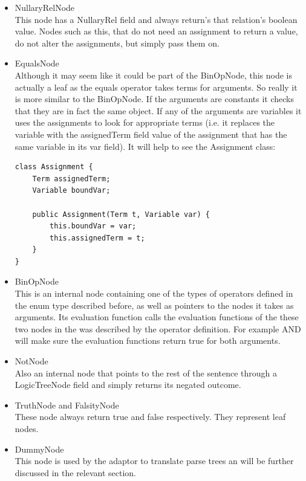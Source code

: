 \documentclass{report}
\begin{document}
\begin{itemize}
\item NullaryRelNode \\
This node has a NullaryRel field and always return's that relation's boolean 
value. Nodes such as this, that do not need an assignment to return a value,
do not alter the assignments, but simply pass them on.

\item EqualsNode \\
Although it may seem like it could be part of the BinOpNode, this node is 
actually a leaf as the equals operator takes terms for arguments. So really it 
is more similar to the BinOpNode. If the arguments are constants it checks that 
they are in fact the same object. If any of the arguments are variables it uses 
the assignments to look for appropriate terms (i.e. it replaces the variable 
with the assignedTerm field value of the assignment that has the same variable 
in its var field). It will help to see the Assignment class:
\begin{verbatim}
class Assignment {
    Term assignedTerm;
    Variable boundVar;

    public Assignment(Term t, Variable var) {
        this.boundVar = var;
        this.assignedTerm = t;
    }
}
\end{verbatim}

\item BinOpNode \\
This is an internal node containing one of the types of operators defined in the 
enum type described before, as well as pointers to the nodes it takes as 
arguments. Its evaluation function calls the evaluation functions of the these 
two nodes in the was described by the operator definition. For example AND will 
make sure the evaluation functions return true for both arguments.

\item NotNode \\
Also an internal node that points to the rest of the sentence through a 
LogicTreeNode field and simply returns its negated outcome.

\item TruthNode and FalsityNode \\
These node always return true and false respectively. They represent leaf nodes.

\item DummyNode \\
This node is used by the adaptor to translate parse trees an will be further 
discussed in the relevant section.
\end{itemize}
\end{document}
